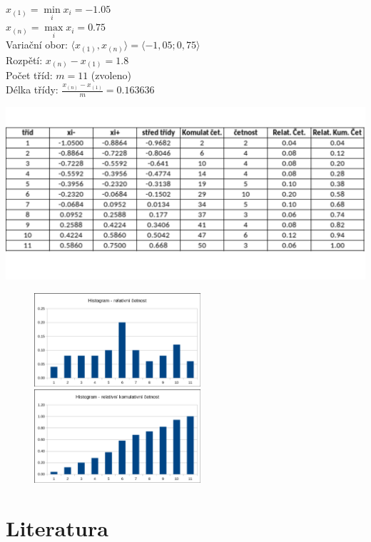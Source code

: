 \documentclass[11pt,a4paper]{article}
\begin{document}
$x_{(1)} = \min\limits_i x_i = -1.05$ \\

$x_{(n)} = \max\limits_i x_i = 0.75$ \\

Variační obor: $ \langle x_{(1)}, x_{(n)} \rangle = \langle -1,05; 0,75 \rangle$ \\

Rozpětí: $ x_{(n)} - x_{(1)} = 1.8 $ \\

Počet tříd: $m = 11$ (zvoleno) \\ 

Délka třídy: $\frac{x_{(n)} - x_{(1)}}{m} = 0.163636 $

\includegraphics[width=\textwidth]{img/1atable.pdf}\vspace{-1.5cm}

\begin{figure}[H]
    \centering
    \includegraphics[width=0.55\textwidth]{img/1ahistogram1.pdf}
    \includegraphics[width=0.55\textwidth]{img/1ahistogram2.pdf}
\end{figure}



\newpage























\newpage

\section{Literatura}

\begin{flushleft}
    
\end{flushleft}
\end{document}
